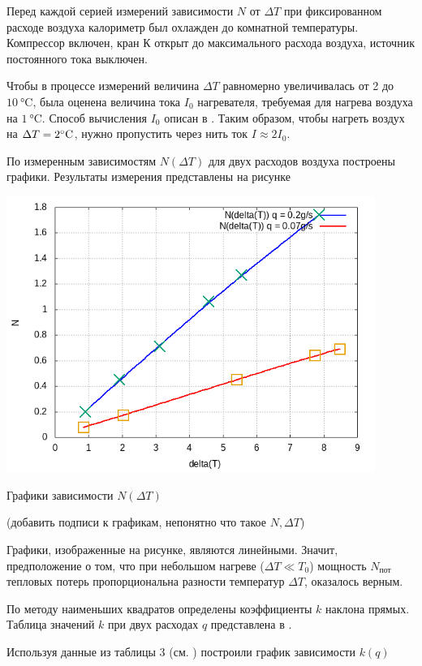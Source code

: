 Перед каждой серией измерений зависимости $N$ от $\Delta T$ при фиксированном расходе воздуха калориметр был охлажден до комнатной температуры. Компрессор включен, кран К открыт до максимального расхода воздуха, источник постоянного тока выключен. 

Чтобы в процессе измерений величина $\Delta T$ равномерно увеличивалась от 2 до $\SI{10}{\celsius}$, была оценена величина тока $I_0$ нагревателя, требуемая для нагрева воздуха на $\SI{1}{\celsius}$. Способ вычисления $I_0$ описан в . Таким образом, чтобы нагреть воздух на $\Delta T = 2\celsius$, нужно пропустить через нить ток $I \approx 2I_0$.

По измеренным зависимостям $N(\Delta T)$ для двух расходов воздуха построены графики. Результаты измерения представлены на рисунке
\begin{center}
    \includegraphics[width=0.9\textwidth]{img/graph4 (2).png}
    
    Графики зависимости $N(\Delta T)$
\end{center}
(добавить подписи к графикам, непонятно что такое $N, \Delta T$)

Графики, изображенные на рисунке, являются линейными. Значит, предположение о том, что при небольшом нагреве ($\Delta T \ll T_0$) мощность $N_\text{пот}$ тепловых потерь пропорциональна разности температур $\Delta T$, оказалось верным.

По методу наименьших квадратов определены коэффициенты $k$ наклона прямых. Таблица значений $k$ при двух расходах $q$ представлена в .

Используя данные из таблицы 3 (см. ) построили график зависимости $k(q)$ 

